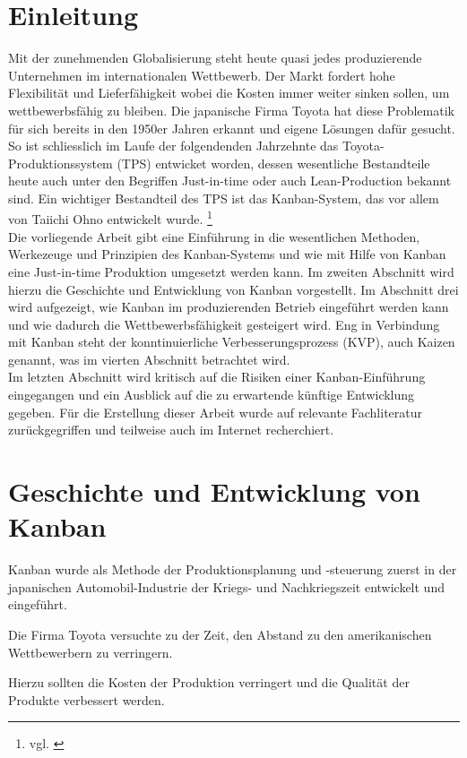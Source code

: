 \section{Einleitung}
Mit der zunehmenden Globalisierung steht heute quasi jedes produzierende Unternehmen 
im internationalen Wettbewerb. Der Markt fordert hohe Flexibilität und Lieferfähigkeit 
wobei die Kosten immer weiter sinken sollen, um wettbewerbsfähig zu bleiben.
Die japanische Firma Toyota hat diese Problematik für sich bereits in den 1950er
Jahren erkannt und eigene Lösungen dafür gesucht. So ist schliesslich im Laufe der
folgendenden Jahrzehnte das Toyota-Produktionssystem (TPS) entwicket worden, dessen 
wesentliche Bestandteile heute auch unter den Begriffen Just-in-time oder auch 
Lean-Production bekannt sind. Ein wichtiger Bestandteil des TPS ist das
Kanban-System, das vor allem von Taiichi Ohno entwickelt wurde.
\footnote{vgl. \cite{Ohno2013TPS}}\\
Die vorliegende Arbeit gibt eine Einführung in die wesentlichen Methoden, 
Werkezeuge und Prinzipien des Kanban-Systems und wie mit Hilfe von Kanban eine
Just-in-time Produktion umgesetzt werden kann. Im zweiten Abschnitt wird hierzu
die Geschichte und Entwicklung von Kanban vorgestellt.
Im Abschnitt drei wird aufgezeigt, wie Kanban im produzierenden Betrieb 
eingeführt werden kann und wie dadurch die Wettbewerbsfähigkeit gesteigert wird. 
Eng in Verbindung mit Kanban steht der konntinuierliche Verbesserungsprozess 
(KVP), auch Kaizen genannt, was im vierten Abschnitt betrachtet wird.\\
Im letzten Abschnitt wird kritisch auf die Risiken einer Kanban-Einführung
eingegangen und ein Ausblick auf die zu erwartende künftige Entwicklung gegeben.
Für die Erstellung dieser Arbeit wurde auf relevante Fachliteratur zurückgegriffen
und teilweise auch im Internet recherchiert.


\section{Geschichte und Entwicklung von Kanban}

Kanban wurde als Methode der Produktionsplanung und -steuerung zuerst in der 
japanischen Automobil-Industrie der Kriegs- und Nachkriegszeit entwickelt und 
eingeführt.

Die Firma Toyota versuchte zu der Zeit, den Abstand zu den amerikanischen 
Wettbewerbern zu verringern.

Hierzu sollten die Kosten der Produktion verringert und die Qualität der 
Produkte verbessert werden.

